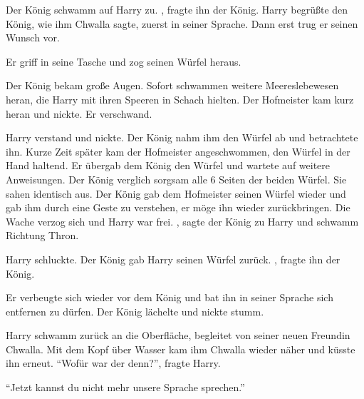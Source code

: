 Der König schwamm auf Harry zu. , fragte ihn der König. Harry begrüßte den König, wie ihm Chwalla sagte, zuerst in seiner Sprache. Dann erst trug er seinen Wunsch vor.

 Er griff in seine Tasche und zog seinen Würfel heraus.

Der König bekam große Augen.  Sofort schwammen weitere Meereslebewesen heran, die Harry mit ihren Speeren in Schach hielten.  Der Hofmeister kam kurz heran und nickte. Er verschwand. 

Harry verstand und nickte. Der König nahm ihm den Würfel ab und betrachtete ihn. Kurze Zeit später kam der Hofmeister angeschwommen, den Würfel in der Hand haltend. Er übergab dem König den Würfel und wartete auf weitere Anweisungen. Der König verglich sorgsam alle 6 Seiten der beiden Würfel. Sie sahen identisch aus. Der König gab dem Hofmeister seinen Würfel wieder und gab ihm durch eine Geste zu verstehen, er möge ihn wieder zurückbringen. Die Wache verzog sich und Harry war frei. , sagte der König zu Harry und schwamm Richtung Thron.

 Harry schluckte. Der König gab Harry seinen Würfel zurück. , fragte ihn der König.

 Er verbeugte sich wieder vor dem König und bat ihn in seiner Sprache sich entfernen zu dürfen. Der König lächelte und nickte stumm.

Harry schwamm zurück an die Oberfläche, begleitet von seiner neuen Freundin Chwalla. Mit dem Kopf über Wasser kam ihm Chwalla wieder näher und küsste ihn erneut. \enquote{Wofür war der denn?}, fragte Harry.

\enquote{Jetzt kannst du nicht mehr unsere Sprache sprechen.}

